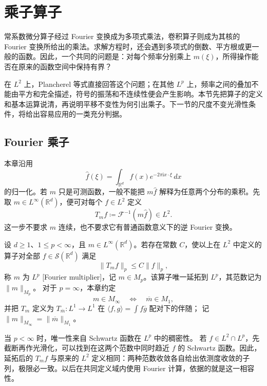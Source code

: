 \section{乘子算子}
\label{b2:sec:2201}

常系数微分算子经过 Fourier 变换成为多项式乘法，卷积算子则成为其核的 Fourier 变换所给出的乘法。求解方程时，还会遇到多项式的倒数、平方根或更一般的函数。因此，一个共同的问题是：对每个频率分别乘上 \(m(\xi)\)，所得操作能否在原来的函数空间中保持有界？

\ProseParagraphBreak
在 \(L^2\) 上，Plancherel 等式直接回答这个问题；在其他 \(L^p\) 上，频率之间的叠加不能由平方和完全描述，符号的振荡和不连续性便会产生影响。本节先把算子的定义和基本运算说清，再说明平移不变性为何引出乘子。下一节的尺度不变光滑性条件，将给出容易应用的一类充分判据。

\subsection{Fourier 乘子}
\label{b2:subsec:220101}

本章沿用
\[
 \widehat f(\xi)=\int_{\mathbb R^d}
 f(x)e^{-2\pi\mathrm i x\cdot\xi}\,dx
\]
的归一化。若 \(m\) 只是可测函数，一般不能把 \(m\widehat f\) 解释为任意两个分布的乘积。先取 \(m\in L^\infty(\mathbb R^d)\)，便可对每个 \(f\in L^2\) 定义
\[
 T_m f\coloneqq\mathcal F^{-1}(m\widehat f)\in L^2.
\]
这一步不要求 \(m\) 连续，也不要求它有普通函数意义下的逆 Fourier 变换。

\begin{definition}[Fourier 乘子]\label{b2:def:22-multiplier}
设 \(d\geq1\)、\(1\leq p<\infty\)，且
\(m\in L^\infty(\mathbb R^d)\)。若存在常数 \(C\)，使以上在
\(L^2\) 中定义的算子对全部 \(f\in\mathcal S(\mathbb R^d)\) 满足
\[
 \|T_m f\|_p\leq C\|f\|_p,
\]
称 \(m\) 为 \(L^p\) [Fourier multiplier]，记 \(m\in M_p\)。该算子唯一延拓到
\(L^p\)，其范数记为 \(\|m\|_{M_p}\)。
对于 \(p=\infty\)，本章约定
\[
 m\in M_\infty\quad\Longleftrightarrow\quad
 \overline m\in M_1,
\]
并把 \(T_m\) 定义为 \(T_{\overline m}:L^1\to L^1\) 在
\(\langle f,g\rangle=\int f\overline g\) 配对下的伴随；
记 \(\|m\|_{M_\infty}=\|\overline m\|_{M_1}\)。
\end{definition}

当 \(p<\infty\) 时，唯一性来自 Schwartz 函数在 \(L^p\) 中的稠密性。
若 \(f\in L^2\cap L^p\)，先截断再作光滑化，可以找到在这两个范数中同时趋近 \(f\) 的 Schwartz 函数。因此，延拓后的 \(T_m f\) 与原来的 \(L^2\) 定义相同：两种范数收敛各自给出依测度收敛的子列，极限必一致。以后在共同定义域内使用 Fourier 计算，依据的就是这一相容性。


